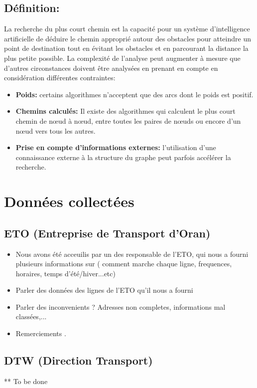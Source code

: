 	\subsection{Définition:}
	La recherche du plus court chemin est la capacité pour un système d'intelligence artificielle de déduire le chemin approprié autour des obstacles pour atteindre un point de destination tout en évitant les obstacles et en parcourant la distance la plus petite possible. La complexité de l'analyse peut augmenter à mesure que d'autres circonstances doivent être analysées en prenant en compte en considération différentes contraintes:
	\begin{itemize}
	\item \textbf{Poids:} certains algorithmes n'acceptent que des arcs dont le poids est positif.
	\item \textbf{Chemins calculés:} Il existe des algorithmes qui calculent le plus court chemin de nœud à nœud, entre toutes les paires de nœuds ou encore d'un nœud vers tous les autres.
	\item \textbf{Prise en compte d'informations externes:} l'utilisation d'une connaissance externe à la structure du graphe peut parfois accélérer la recherche.
	\end{itemize}






	\section{Données collectées}
	\subsection{ETO (Entreprise de Transport d'Oran)}
	\begin{itemize}
	\item Nous avons été acceuilis par un des responsable de l'ETO, qui nous a fourni plusieurs informations sur ( comment marche chaque ligne, frequences, horaires, temps d'été/hiver...etc)
	\item Parler des données des lignes de l'ETO qu'il nous a fourni
	\item Parler des inconvenients ? Adresses non completes, informations mal classées,...
	\item Remerciements .
	\end{itemize}
	\subsection{DTW (Direction Transport)}
	** To be done
